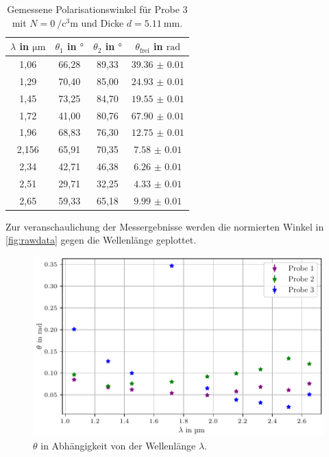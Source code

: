 \begin{table}[H]
    \centering
    \caption{Gemessene Polarisationswinkel für Probe 3 mit $N = \qty{0}{\per\cubic\centi\meter}$ und Dicke $d = \qty{5.11}{\milli\meter}$.}
    \label{tab:probe3}
    \begin{tabular}{c c c c}
        \toprule
        {$\lambda$ in $\si{\micro\meter}$} & {$\theta_1$ in $\si{\degree}$} & {$\theta_2$ in $\si{\degree}$} & {$\theta_\text{frei}$ in $\si{\radian}$} \\
        \midrule
        1,06  & 66,28 & 89,33 & $\num{39.36(1)}$ \\
        1,29  & 70,40 & 85,00 & $\num{24.93(1)}$ \\
        1,45  & 73,25 & 84,70 & $\num{19.55(1)}$ \\
        1,72  & 41,00 & 80,76 & $\num{67.90(1)}$ \\
        1,96  & 68,83 & 76,30 & $\num{12.75(1)}$ \\
        2,156 & 65,91 & 70,35 & $\num{7.58(1)}$  \\
        2,34  & 42,71 & 46,38 & $\num{6.26(1)}$ \\
        2,51  & 29,71 & 32,25 & $\num{4.33(1)}$ \\
        2,65  & 59,33 & 65,18 & $\num{9.99(1)}$ \\   
        \bottomrule
    \end{tabular}
\end{table}
Zur veranschaulichung der Messergebnisse werden die normierten Winkel in \autoref{fig:rawdata} gegen die Wellenlänge geplottet.
\begin{figure}
    \centering
    \includegraphics[width=\textwidth]{plots/raw_data.pdf}
    \caption{$\theta$ in Abhängigkeit von der Wellenlänge $\lambda$.}
    \label{fig:rawdata}
\end{figure}



